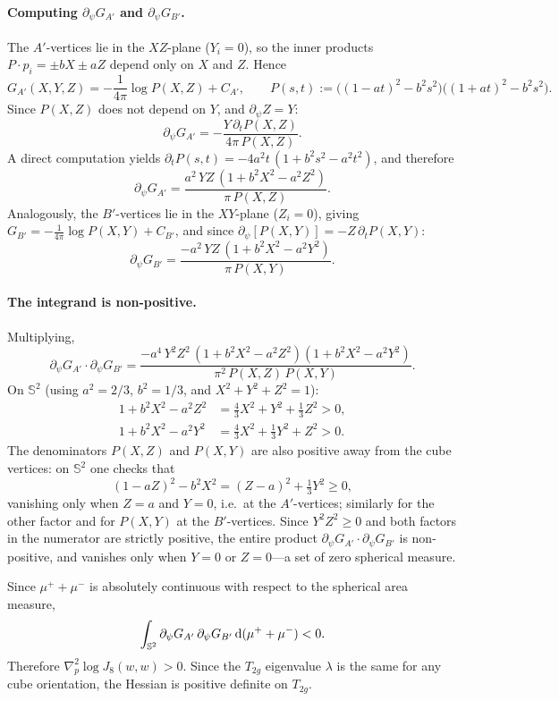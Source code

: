 \documentclass[a4paper]{amsart}
\newcommand{\uS}{\mathbb{S}}
\newcommand{\Hess}{\nabla^2}
\newcommand{\dd}{{\rm d}}
\theoremstyle{plain} %
\theoremstyle{definition} %
\theoremstyle{remark}
\begin{document}
\paragraph{Computing $\partial_\psi G_{A'}$ and $\partial_\psi G_{B'}$.}
The $A'$-vertices lie in the $XZ$-plane ($Y_i=0$), so the inner products
$P\cdot p_i = \pm bX\pm aZ$ depend only on $X$ and $Z$.  Hence
\[
	G_{A'}(X,Y,Z)
	= -\frac{1}{4\pi}\log P(X,Z)+C_{A'},
	\qquad
	P(s,t):=\bigl((1-at)^2-b^2s^2\bigr)\bigl((1+at)^2-b^2s^2\bigr).
\]
Since $P(X,Z)$ does not depend on $Y$, and $\partial_\psi Z = Y$:
\[
	\partial_\psi G_{A'}
	= -\frac{Y\,\partial_t P(X,Z)}{4\pi\,P(X,Z)}.
\]
A direct computation yields $\partial_t P(s,t)=-4a^2t\,(1+b^2s^2-a^2t^2)$, and therefore
\[
	\partial_\psi G_{A'}
	= \frac{a^2\,YZ\,(1+b^2X^2-a^2Z^2)}{\pi\,P(X,Z)}.
\]
Analogously, the $B'$-vertices lie in the $XY$-plane ($Z_i=0$), giving
$G_{B'}=-\tfrac{1}{4\pi}\log P(X,Y)+C_{B'}$, and since $\partial_\psi[P(X,Y)]=-Z\,\partial_t P(X,Y)$:
\[
	\partial_\psi G_{B'}
	= \frac{-a^2\,YZ\,(1+b^2X^2-a^2Y^2)}{\pi\,P(X,Y)}.
\]

\paragraph{The integrand is non-positive.}
Multiplying,
\[
	\partial_\psi G_{A'}\cdot\partial_\psi G_{B'}
	= \frac{-a^4\,Y^2Z^2\,(1+b^2X^2-a^2Z^2)(1+b^2X^2-a^2Y^2)}{\pi^2\,P(X,Z)\,P(X,Y)}.
\]
On $\uS^2$ (using $a^2=2/3$, $b^2=1/3$, and $X^2+Y^2+Z^2=1$):
\begin{align*}
	1+b^2X^2-a^2Z^2
	&= \tfrac{4}{3}X^2+Y^2+\tfrac{1}{3}Z^2 > 0,\\
	1+b^2X^2-a^2Y^2
	&= \tfrac{4}{3}X^2+\tfrac{1}{3}Y^2+Z^2 > 0.
\end{align*}
The denominators $P(X,Z)$ and $P(X,Y)$ are also positive away from the cube
vertices: on $\uS^2$ one checks that
\[
	(1-aZ)^2-b^2X^2 = (Z-a)^2+\tfrac13 Y^2\ge 0,
\]
vanishing only when $Z=a$ and $Y=0$, i.e.\ at the $A'$-vertices; similarly for
the other factor and for $P(X,Y)$ at the $B'$-vertices.
Since $Y^2Z^2\ge0$ and both factors in the numerator are strictly positive, the
entire product $\partial_\psi G_{A'}\cdot\partial_\psi G_{B'}$ is non-positive,
and vanishes only when $Y=0$ or $Z=0$---a set of zero spherical measure.

Since $\mu^++\mu^-$ is absolutely continuous with respect to the spherical area
measure,
\[
	\int_{\uS^2}\partial_\psi G_{A'}\,\partial_\psi G_{B'}\,\dd(\mu^++\mu^-)
	< 0.
\]
Therefore $\Hess_p\log J_8(w,w)>0$.  Since the $T_{2g}$ eigenvalue $\lambda$ is
the same for any cube orientation, the Hessian is positive definite on $T_{2g}$.



\end{document}
